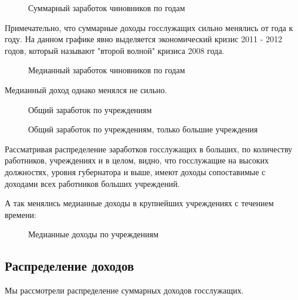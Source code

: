 \documentclass[a4paper,14pt]{article}
\begin{document}
  \begin{figure}[H]
    \centering
    \caption{Суммарный заработок чиновников по годам}
  \end{figure}

  Примечательно, что суммарные доходы госслужащих сильно менялись от года к году. На данном графике явно выделяется экономический кризис 2011 - 2012 годов, который называют "второй волной" кризиса 2008 года.

  \begin{figure}[H]
    \centering
    \caption{Медианный заработок чиновников по годам}
  \end{figure}

  Медианный доход однако менялся не сильно.

  \begin{figure}[H]
    \centering
    \caption{Общий заработок по учреждениям}
  \end{figure}

  \begin{figure}[H]
    \centering
    \caption{Общий заработок по учреждениям, только большие учреждения}
  \end{figure}

  Рассматривая распределение заработков госслужащих в больших, по количеству работников, учреждениях и в целом, видно, что госслужащие на высоких должностях, уровня губернатора и выше, имеют доходы сопоставимые с доходами всех работников больших учреждений.

  А так менялись медианные доходы в крупнейших учреждениях с течением времени:

  \begin{figure}[H]
    \centering
    \caption{Медианные доходы по учреждениям}
  \end{figure}
  
  \subsection{Распределение доходов}

  Мы рассмотрели распределение суммарных доходов госслужащих.
\end{document}
